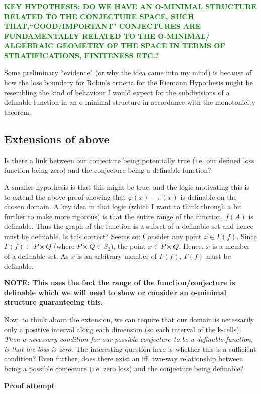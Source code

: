 \textcolor{green}{\textbf{KEY HYPOTHESIS: DO WE HAVE AN O-MINIMAL STRUCTURE RELATED TO THE CONJECTURE SPACE, SUCH THAT,``GOOD/IMPORTANT" CONJECTURES 
ARE FUNDAMENTALLY RELATED TO THE O-MINIMAL/ ALGEBRAIC GEOMETRY OF THE SPACE IN TERMS OF STRATIFICATIONS, FINITENESS ETC.?}
}

Some preliminary ``evidence" (or why the idea came into my mind) is because of how the loss boundary for Robin's criteria for the Riemann Hypothesis might be resembling the kind of behaviour I would expect for the subdivisions of a definable function in an o-minimal structure in accordance with the monotonicity theorem.

\subsection{Extensions of above}
Is there a link between our conjecture being potentially true (i.e. our defined loss function being zero) and the conjecture being a definable function?
\par A smaller hypothesis is that this might be true, and the logic motivating this is to extend the above proof showing that $\varphi(x) - \pi(x)$ is definable on the chosen domain. A key idea in that logic (which I want to think through a bit further to make more rigorous) is that the entire range of the function, $f(A)$ is definable. Thus the graph of the function is a subset of a definable set and hence must be definable. Is this correct? Seems so: Consider any point $x\in\Gamma(f)$. Since $\Gamma(f)\subset P\times Q$ (where $P\times Q\in S_2$), the point $x\in P\times Q$. Hence, $x$ is a member of a definable set. As $x$ is an arbitrary member of $\Gamma(f)$, $\Gamma(f)$ must be definable.

\textbf{NOTE: This uses the fact the range of the function/conjecture is definable which we will need to show or consider an o-minimal structure guaranteeing this.}

Now, to think about the extension, we can require that our domain is necessarily only a positive interval along each dimension (so each interval of the k-cells). \textit{Then a necessary condition for our possible conjecture to be a definable function, is that the loss is zero.} The interesting question here is whether this is a sufficient condition? Even further, does there exist an iff, two-way relationship between being a possible conjecture (i.e. zero loss) and the conjecture being definable?

\textbf{Proof attempt}

